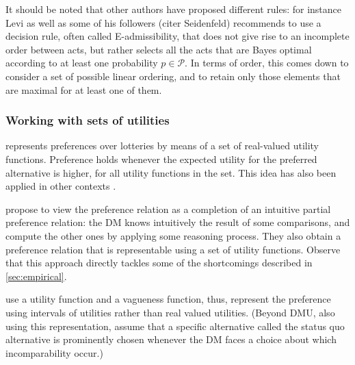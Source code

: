\documentclass[french, english]{llncs}
\begin{document}
	It should be noted that other authors have proposed different rules: for instance Levi as well as some of his followers (citer Seidenfeld) recommends to use a decision rule, often called E-admissibility, that does not give rise to an incomplete order between acts, but rather selects all the acts that are Bayes optimal according to at least one probability $p \in \mathcal{P}$. In terms of order, this comes down to consider a set of possible linear ordering, and to retain only those elements that are maximal for at least one of them. 
	
	
	\subsubsection{Working with sets of utilities}
	
	\citet{dubra_expected_2004} represents preferences over lotteries by means of a set of real-valued utility functions. Preference holds whenever the expected utility for the preferred alternative is higher, for all utility functions in the set. This idea has also been applied in other contexts \citep{ok_utility_2002, eliaz_indifference_2006}.
	
	\citet{dubra_model_2002} propose to view the preference relation as a completion of an intuitive partial preference relation: the \ac{DM} knows intuitively the result of some comparisons, and compute the other ones by applying some reasoning process. They also obtain a preference relation that is representable using a set of utility functions. Observe that this approach directly tackles some of the shortcomings described in \cref{sec:empirical}.
	
	\citet{manzini_representation_2008} use a utility function and a vagueness function, thus, represent the preference using intervals of utilities rather than real valued utilities. (Beyond DMU, also using this representation, \citet{masatlioglu_rational_2005} assume that a specific alternative called the status quo alternative is prominently chosen whenever the \ac{DM} faces a choice about which incomparability occur.)
	
\end{document}

